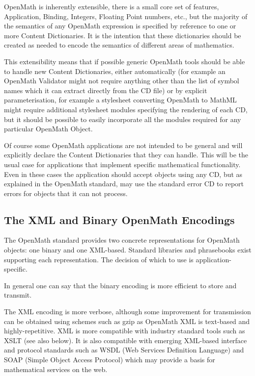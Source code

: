 \documentclass[report,keylogo]{openmath}
\begin{document}
OpenMath is inherently extensible, there is a small core set of
features, Application, Binding, Integers, Floating Point numbers,
etc., but the majority of the semantics of any OpenMath expression is
specified by reference to one or more Content Dictionaries. It is the
intention that these dictionaries should be created as needed to
encode the semantics of different areas of mathematics.

This extensibility means that if possible generic OpenMath tools
should be able to handle new Content Dictionaries, either
automatically (for example an OpenMath Validator might not require
anything other than the list of symbol names which it can extract
directly from the CD file) or by explicit parameterisation, for
example a stylesheet converting OpenMath to MathML might require
additional stylesheet modules specifying the rendering of each CD, but
it should be possible to easily incorporate all the modules required
for any particular OpenMath Object.

Of course some OpenMath applications are not intended to be general
and will explicitly declare the Content Dictionaries that they can
handle.  This will be the usual case for applications that implement
specific mathematical functionality. Even in these cases the
application should accept objects using any CD, but as explained in
the OpenMath standard, may use the standard error CD to report errors
for objects that it can not process.

\subsection {The XML and Binary OpenMath Encodings}

The OpenMath standard provides two concrete representations for
OpenMath objects: one binary and one XML-based. Standard libraries and
phrasebooks exist supporting each representation. The decision of
which to use is application-specific.

In general one can say that the binary encoding is more efficient to
store and transmit.

The XML encoding is more verbose, although some improvement for
transmission can be obtained using schemes such as gzip as OpenMath
XML is text-based and highly-repetitive.  XML is more compatible with
industry standard tools such as XSLT (see also below). It is also
compatible with emerging XML-based interface and protocol standards
such as WSDL (Web Services Definition Language) and SOAP (Simple
Object Access Protocol) which may provide a basis for mathematical
services on the web.
\end{document}

